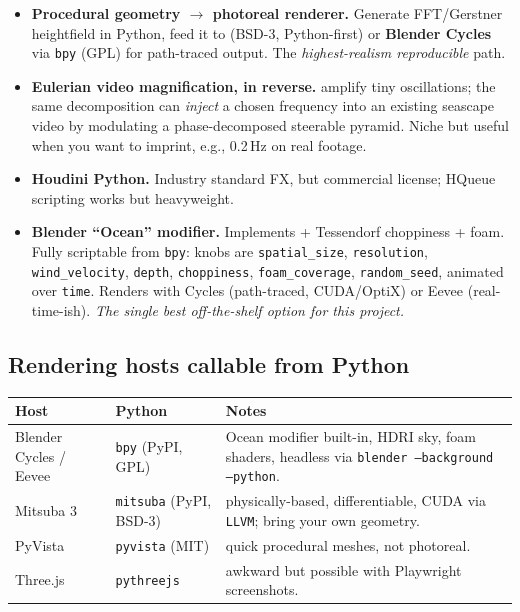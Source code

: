 \documentclass[11pt,a4paper]{article}
\newcommand{\code}[1]{\texttt{\small #1}}
\begin{document}
\begin{itemize}[leftmargin=1.5em,itemsep=0.3em]
  \item \textbf{Procedural geometry $\to$ photoreal renderer.}
        Generate FFT/Gerstner heightfield in Python, feed it to
        \citep{mitsuba3} (BSD-3, Python-first) or \textbf{Blender Cycles}
        via \code{bpy} (GPL) for path-traced output. The
        \emph{highest-realism reproducible} path.
  \item \textbf{Eulerian video magnification, in reverse.}
        \citep{wu2012,wadhwa2013} amplify tiny oscillations; the same
        decomposition can \emph{inject} a chosen frequency into an
        existing seascape video by modulating a phase-decomposed steerable
        pyramid. Niche but useful when you want to imprint, e.g., 0.2\,Hz
        on real footage.
  \item \textbf{Houdini Python.} Industry standard FX, but commercial
        license; HQueue scripting works but heavyweight.
  \item \textbf{Blender ``Ocean'' modifier.} Implements
        \citet{mastin1987} + Tessendorf choppiness + foam. Fully
        scriptable from \code{bpy}: knobs are \code{spatial\_size},
        \code{resolution}, \code{wind\_velocity}, \code{depth},
        \code{choppiness}, \code{foam\_coverage}, \code{random\_seed},
        animated over \code{time}. Renders with Cycles
        (path-traced, CUDA/OptiX) or Eevee (real-time-ish). \emph{The
        single best off-the-shelf option for this project.}
\end{itemize}

\subsection{Rendering hosts callable from Python}

\begin{tabularx}{\linewidth}{l l X}
\toprule
\textbf{Host} & \textbf{Python} & \textbf{Notes} \\
\midrule
Blender Cycles / Eevee & \code{bpy} (PyPI, GPL) & Ocean modifier built-in,
  HDRI sky, foam shaders, headless via
  \code{blender --background --python}.\\
Mitsuba 3              & \code{mitsuba} (PyPI, BSD-3) & physically-based,
  differentiable, CUDA via \code{LLVM}; bring your own geometry.\\
PyVista                & \code{pyvista} (MIT)    & quick procedural
  meshes, not photoreal.\\
Three.js               & \code{pythreejs}        & awkward but possible
  with Playwright screenshots.\\
\bottomrule
\end{tabularx}
\end{document}
